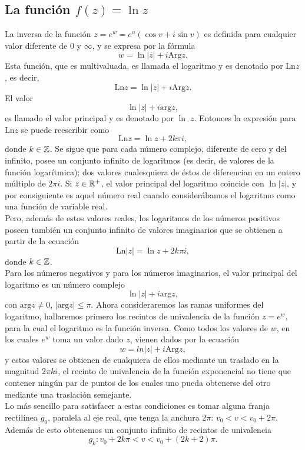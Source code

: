 \subsection{La función $f(z)=\ln z$}
La inversa de la función $z=e^w=e^{u}(\cos v +i\sin v)$
es definida para cualquier valor diferente de $0$ y $\infty$, y se expresa por la fórmula 
$$w=\ln|z|+i\mbox{Arg}z.$$
Esta función, que es multivaluada, es llamada el logaritmo y es denotado por $\mbox{Ln}z$, es decir, 
$$\mbox{Ln}z=\ln|z|+i\mbox{Arg}z.$$
El valor $$\ln|z|+i\mbox{arg}z,$$ es llamado el valor principal y es denotado por $\ln\;z$. Entonces la expresión para $\mbox{Ln}z$ se puede reescribir como
$$\mbox{Ln}z=\ln z+2k\pi i,$$
donde $k\in\mathbb{Z}$. Se sigue que para cada número complejo, diferente de cero y del infinito, posee un conjunto infinito de logaritmos (es decir, de valores de la función logarítmica); dos valores cualesquiera de éstos de diferencian en un entero múltiplo de $2\pi i$. Si $z\in \mathbb{R}^{+}$, el valor principal del logaritmo coincide con $\ln|z|$, y por consiguiente es aquel número real cuando considerábamos el logaritmo como una función de variable real.\\
Pero, además de estos valores reales, los logaritmos de los números positivos poseen también un conjunto infinito de valores imaginarios que se obtienen a partir de la ecuación 
$$\mbox{Ln} |z|=\ln z+2k\pi i,$$
donde $k\in \mathbb{Z}$.\\
Para los números negativos y para los números imaginarios, el valor principal del logaritmo es un número complejo
$$\ln |z|+i\mbox{arg}z,$$ 
con $\mbox{arg}z\neq 0$, $|\mbox{arg}z|\leq \pi.$
Ahora consideraremos las ramas uniformes del logaritmo, hallaremos primero los recintos de univalencia de la función $z=e^w$, para la cual el logaritmo es la función inversa. Como todos los valores de $w$, en los cuales $e^{w}$ toma un valor dado $z$, vienen dados por la ecuación $$w=ln |z|+i\mbox{Arg}z,$$ y estos valores se obtienen de cualquiera de ellos mediante un traslado en la magnitud $2\pi k i$, el recinto de univalencia de la función exponencial no tiene que contener ningún par de puntos de los cuales uno pueda obtenerse del otro mediante una traslación semejante. \\
Lo más sencillo para satisfacer a estas condiciones es tomar alguna franja rectilínea $g_0$, paralela al eje real, que tenga la anchura $2\pi$: $v_0<v<v_0+2\pi$. Además de esto obtenemos un conjunto infinito de recintos de univalencia $$g_k:v_0+2k\pi<v<v_0+(2k+2)\pi.$$
